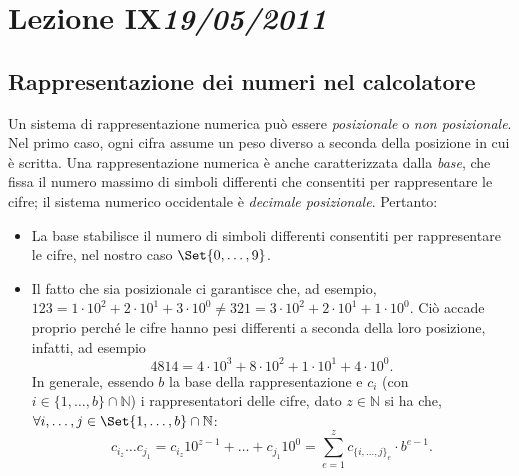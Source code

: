 \chapter[Lezione IX]{Lezione IX\newline\small{\emph{19/05/2011}}}
	\section{Rappresentazione dei numeri nel calcolatore}
Un sistema di rappresentazione numerica può essere \emph{posizionale} o \emph{non posizionale}.
Nel primo caso, ogni cifra assume un peso diverso a seconda della posizione in cui è scritta.
Una rappresentazione numerica è anche caratterizzata dalla \emph{base}, che fissa il numero massimo di simboli differenti che consentiti per rappresentare le cifre; il sistema numerico occidentale è \emph{decimale posizionale}. Pertanto:
\begin{itemize}
	\item
La base stabilisce il numero di simboli differenti consentiti per rappresentare le cifre, nel nostro caso $\Set{0, \dots , 9}$.
	\item
Il fatto che sia posizionale ci garantisce che, ad esempio, $123=1\cdot 10^2+2\cdot 10^1+3\cdot 10^0 \neq 321=3\cdot 10^2+2\cdot 10^1+1\cdot 10^0$.
Ciò accade proprio perché le cifre hanno pesi differenti a seconda della loro posizione, infatti, ad esempio
\[
4814=4\cdot10^3+8\cdot10^2+1\cdot10^1+4\cdot10^0.
\]
In generale, essendo $b$ la base della rappresentazione e $c_i$ (con $i\in\{1,\dots,b\}\cap\mathbb{N}$) i rappresentatori delle cifre, dato $z\in\mathbb{N}$  si ha che, $\forall i,\dots,j\in\Set{1,\dots,b}\cap\mathbb{N}$:
\[
c_{i_z}\dots c_{j_1}=c_{i_z}10^{z-1}+\dots+c_{j_1}10^{0}=\sum_{e=1}^z c_{\{i,\dots,j\}_e}\cdot b^{e-1}.
\]
\end{itemize}

